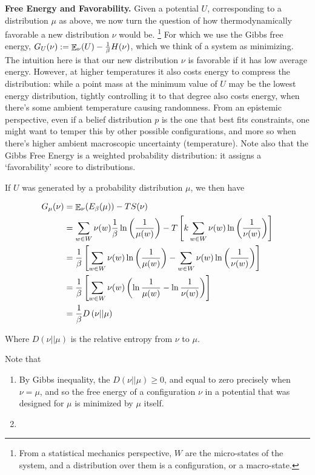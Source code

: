\documentclass{article}
\numberwithin{equation}{section}
\begin{document}
	\textbf{Free Energy and Favorability.} Given a potential $U$, corresponding to a distribution $\mu$ as above, we now turn the question of how thermodynamically favorable a new distribution $\nu$ would be.%
		\footnote{From a statistical mechanics perspective, $W$ are the micro-states of the system, and a distribution over them is a configuration, or a macro-state.}
	For which we use the Gibbs free energy, $G_U(\nu) := {\mathop{\mathbb E}}_\nu( U ) - \frac{1}{\beta} H(\nu)$, which we think of a system as minimizing. The intuition here is that our new distribution $\nu$ is favorable if it has low average energy. However, at higher temperatures it also costs energy to compress the distribution: while a point mass at the minimum value of $U$ may be the lowest energy distribution, tightly controlling it to that degree also costs energy, when there's some ambient temperature causing randomness. From an epistemic perspective, even if a belief distribution $p$  is the one that best fits constraints, one might want to temper this by other possible configurations, and more so when there's higher ambient macroscopic uncertainty (temperature). Note also that the Gibbs Free Energy is a weighted probability distribution: it assigns a `favorability' score to distributions.
	
	If $U$ was generated by a probability distribution $\mu$, we then have
	
	\begin{align*}
		G_\mu(\nu) &= {\mathop{\mathbb E}}_\nu( E_\beta(\mu) )  - T S(\nu) \\
		&= \sum_{w \in W}\nu(w) \frac{1}{\beta} \ln \left(\frac{1}{\mu(w)}\right) - T \left[k \sum_{w \in W} \nu(w) \ln \left(\frac{1}{\nu(w)}\right)\right]\\
		&=  \frac{1}{\beta}\left[\sum_{w \in W}\nu(w) \ln \left(\frac{1}{\mu(w)}\right) - \sum_{w \in W} \nu(w) \ln \left(\frac{1}{\nu(w)}\right)\right]\\
		&=  \frac{1}{\beta}\left[\sum_{w \in W}\nu(w) \left(\ln \frac{1}{\mu(w)} - \ln \frac{1}{\nu(w)}\right)\right]\\
		&= \frac{1}{\beta} D \left(\nu || \mu \right)
	\end{align*}

	Where $D(\nu || \mu)$ is the relative entropy from $\nu$ to $\mu$. 
	
	Note that \todo{}
	\begin{enumerate}
		\item By Gibbs inequality, the $D(\nu || \mu) \geq 0$, and equal to zero precisely when $\nu = \mu$, and so the free energy of a configuration $\nu$ in a potential that was designed for $\mu$ is minimized by $\mu$ itself.
		
		\item 
	\end{enumerate}
\end{document}

